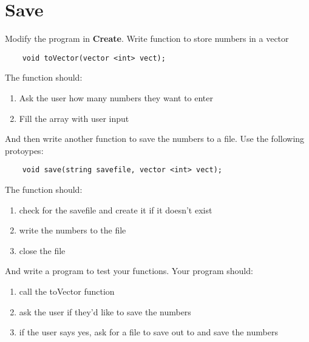 \documentclass{article}
\begin{document}
\section{Save}
Modify the program in \textbf{Create}. Write function to store numbers in a vector
\begin{verbatim}
	void toVector(vector <int> vect);
\end{verbatim}
The function should:
\begin{enumerate}
	\item Ask the user how many numbers they want to enter
	\item Fill the array with user input
\end{enumerate}

 And then write another function to save the numbers to a file. Use the following protoypes:
\begin{verbatim}
	void save(string savefile, vector <int> vect);
\end{verbatim}
The function should:
\begin{enumerate}
	\item check for the savefile and create it if it doesn't exist
	\item write the numbers to the file
	\item close the file
\end{enumerate}
And write a program to test your functions. Your program should:
\begin{enumerate}
	\item call the toVector function
	\item ask the user if they'd like to save the numbers
	\item if the user says yes, ask for a file to save out to and save the numbers
\end{enumerate}
\end{document}
